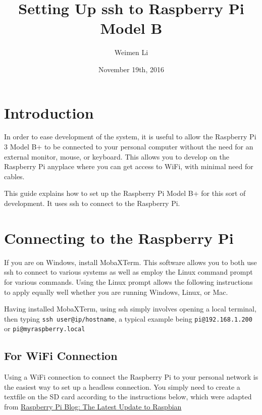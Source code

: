 \documentclass{article}
\begin{document}
	
	\title{Setting Up ssh to Raspberry Pi Model B}
	\author{Weimen Li}
	\date{November 19th, 2016}
	\maketitle
	\tableofcontents
	\section{Introduction}
	In order to ease development of the system, it is useful to allow the Raspberry Pi 3 Model B+ to be connected to your personal computer without the need for an external monitor, mouse, or keyboard. This allows you to develop on the Raspberry Pi anyplace where you can get access to WiFi, with minimal need for cables. 
	
	This guide explains how to set up the Raspberry Pi Model B+ for this sort of development. It uses ssh to connect to the Raspberry Pi.
	
	\section {Connecting to the Raspberry Pi}
	
	If you are on Windows, install MobaXTerm. This software allows you to both use ssh to connect to various systems as well as employ the Linux command prompt for various commands. Using the Linux  prompt allows the following instructions to apply equally well whether you are running Windows, Linux, or Mac.
	
	Having installed MobaXTerm, using ssh simply involves opening a local terminal, then typing \verb|ssh user@ip/hostname|, a typical example being \verb|pi@192.168.1.200| or \verb|pi@myraspberry.local|
	
	\subsection{For WiFi Connection}
	 Using a WiFi connection to connect the Raspberry Pi to your personal network is the easiest way to set up a headless connection. You simply need to create a textfile on the SD card according to the instructions below, which were adapted from \href{https://www.raspberrypi.org/blog/another-update-raspbian/}{Raspberry Pi Blog: The Latest Update to Raspbian}
	 
\end{document}
